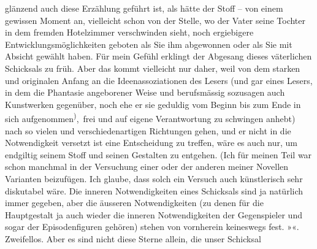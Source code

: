                glänzend auch diese Erzählung geführt ist, als hätte der Stoff – von einem gewissen
               Moment an\introOben{},\introOben{} vielleicht schon von der Stelle, wo der Vater seine Tochter in dem fremden
               Hotelzimmer verschwinden sieht, noch ergiebigere Entwicklungsmöglichkeiten geboten
               als Sie ihm abgewonnen oder als Sie mit Absicht gewählt haben. Für mein Gefühl
               erklingt der Abgesang dieses väterlichen Schicksals zu früh. Aber das kommt
               vielleicht nur daher, weil von dem starken und originalen Anfang an die
               Ideenassoziationen des Lesers (und gar eines Lesers, in dem die Phantasie angeborener
               Weise und berufsmässig sozusagen auch Kunstwerken gegenüber, noch ehe er sie geduldig
                   vom Beginn bis zum Ende in sich aufgenommen\substVorne{}\textsuperscript{)}\substDazwischen{},\substHinten{} frei und auf eigene Verantwortung zu schwingen anhebt) nach so vielen und
               verschiedenartigen {\pb}Richtungen gehen, und er nicht in die
               Notwendigkeit versetzt ist eine Entscheidung zu treffen, wäre es auch nur, um
               endgiltig seinem Stoff und seinen Gestalten zu entgehen. (Ich für meinen Teil war
               schon manchmal in der Versuchung einer oder der anderen meiner Novellen Varianten
               beizufügen. Ich glaube, dass so\introOben{}lch\introOben{} ein Versuch auch künstlerisch sehr diskutabel
               wäre. Die inneren Notwendigkeiten eines Schicksals sind ja natürlich immer gegeben,
               aber die äusseren Notwendigkeiten (zu denen für die Hauptgestalt ja auch wieder die
               inneren Notwendigkeiten der Gegenspieler und sogar der Episodenfiguren gehören)
               stehen von vornherein keineswegs fest. »\label{K_L03747-2v}\label{K_L03747-2}«. Zweifellos. Aber es sind nicht diese Sterne allein, die unser Schicksal

